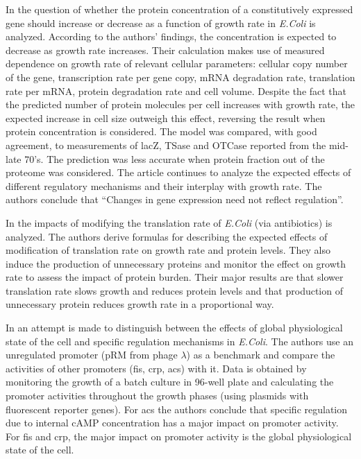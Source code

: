 \documentclass[a4page,notitlepage]{article}
\begin{document}
In \parencite{Klumpp2009a} the question of whether the protein concentration of a constitutively expressed gene should increase or decrease as a function of growth rate in \emph{E.Coli} is analyzed.
According to the authors' findings, the concentration is expected to decrease as growth rate increases.
Their calculation makes use of measured dependence on growth rate of relevant cellular parameters: cellular copy number of the gene, transcription rate per gene copy, mRNA degradation rate, translation rate per mRNA, protein degradation rate and cell volume.
Despite the fact that the predicted number of protein molecules per cell increases with growth rate, the expected increase in cell size outweigh this effect, reversing the result when protein concentration is considered.
The model was compared, with good agreement, to measurements of lacZ, TSase and OTCase reported from the mid-late 70's.
The prediction was less accurate when protein fraction out of the proteome was considered.
The article continues to analyze the expected effects of different regulatory mechanisms and their interplay with growth rate.
The authors conclude that ``Changes in gene expression need not reflect regulation''.

In \parencite{Scott2010b} the impacts of modifying the translation rate of \emph{E.Coli} (via antibiotics) is analyzed.
The authors derive formulas for describing the expected effects of modification of translation rate on growth rate and protein levels.
They also induce the production of unnecessary proteins and monitor the effect on growth rate to assess the impact of protein burden.
Their major results are that slower translation rate slows growth and reduces protein levels and that production of unnecessary protein reduces growth rate in a proportional way.

In \parencite{Berthoumieux2013} an attempt is made to distinguish between the effects of global physiological state of the cell and specific regulation mechanisms in \emph{E.Coli}.
The authors use an unregulated promoter (pRM from phage $\lambda$) as a benchmark and compare the activities of other promoters (fis, crp, acs) with it.
Data is obtained by monitoring the growth of a batch culture in 96-well plate and calculating the promoter activities throughout the growth phases (using plasmids with fluorescent reporter genes).
For acs the authors conclude that specific regulation due to internal cAMP concentration has a major impact on promoter activity.
For fis and crp, the major impact on promoter activity is the global physiological state of the cell.
\end{document}
